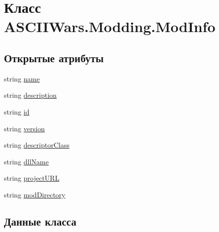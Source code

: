 \hypertarget{class_a_s_c_i_i_wars_1_1_modding_1_1_mod_info}{}\section{Класс A\+S\+C\+I\+I\+Wars.\+Modding.\+Mod\+Info}
\label{class_a_s_c_i_i_wars_1_1_modding_1_1_mod_info}
\subsection*{Открытые атрибуты}
\begin{DoxyCompactItemize}
\item 
string \hyperlink{class_a_s_c_i_i_wars_1_1_modding_1_1_mod_info_a380b495148d3af7a983389bac4e99658}{name}
\item 
string \hyperlink{class_a_s_c_i_i_wars_1_1_modding_1_1_mod_info_a2ddd135a15b305c838f2efbf20441ea2}{description}
\item 
string \hyperlink{class_a_s_c_i_i_wars_1_1_modding_1_1_mod_info_a5ebe9e95930e72b641e0803770b289cd}{id}
\item 
string \hyperlink{class_a_s_c_i_i_wars_1_1_modding_1_1_mod_info_ae2b0f42832ae61750e341eef25e77519}{version}
\item 
string \hyperlink{class_a_s_c_i_i_wars_1_1_modding_1_1_mod_info_a7f39eabbc493e396fdcf224cc02ac12d}{descriptor\+Class}
\item 
string \hyperlink{class_a_s_c_i_i_wars_1_1_modding_1_1_mod_info_a98c44821a33afbcfddb84e2299d73225}{dll\+Name}
\item 
string \hyperlink{class_a_s_c_i_i_wars_1_1_modding_1_1_mod_info_a313468a6ee076b45a223f9c6704f8e22}{project\+U\+RL}
\item 
string \hyperlink{class_a_s_c_i_i_wars_1_1_modding_1_1_mod_info_a5e09899879496f050627f5b92cb3fc2b}{mod\+Directory}
\end{DoxyCompactItemize}


\subsection{Данные класса}
\hypertarget{class_a_s_c_i_i_wars_1_1_modding_1_1_mod_info_a2ddd135a15b305c838f2efbf20441ea2}{}\label{class_a_s_c_i_i_wars_1_1_modding_1_1_mod_info_a2ddd135a15b305c838f2efbf20441ea2} 
